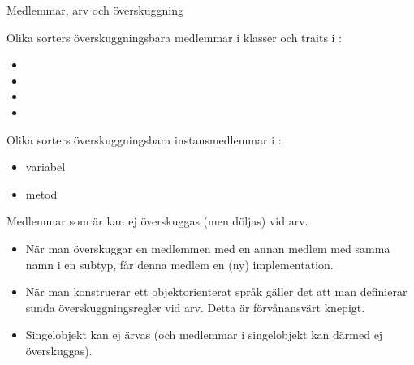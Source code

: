 





\begin{Slide}{Medlemmar, arv och överskuggning}\SlideFontTiny
\begin{multicols}{2}
Olika sorters överskuggningsbara medlemmar i klasser och traits i :
\begin{itemize}
\item {}
\item {}
\item {}
\item {}
\end{itemize}


\columnbreak

\pause

Olika sorters överskuggningsbara instansmedlemmar i :
\begin{itemize}
\item variabel 
\item metod
\end{itemize}

{\SlideFontTiny Medlemmar som är  kan ej överskuggas (men döljas) vid arv.}

\vspace{0.5em}
\end{multicols}

\pause
\begin{itemize}\SlideFontTiny
\item När man överskuggar  en medlemmen med en annan medlem med samma namn i en subtyp, får denna medlem en (ny) implementation. 

\item När man konstruerar ett objektorienterat språk gäller det att man definierar sunda överskuggningsregler vid arv. Detta är förvånansvärt knepigt.

\item Singelobjekt kan ej ärvas (och medlemmar i singelobjekt kan därmed ej överskuggas).
\end{itemize}
\end{Slide}


